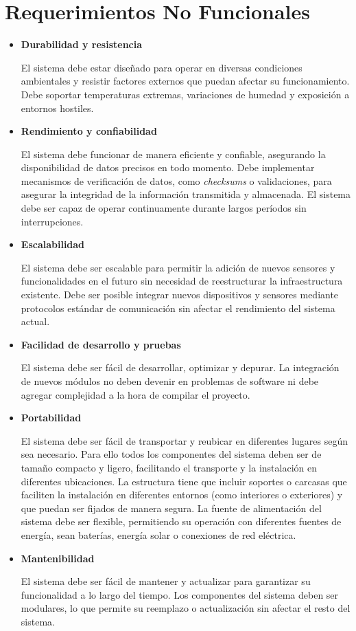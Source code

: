 \section{Requerimientos No Funcionales}
\begin{itemize}
    \item \textbf{Durabilidad y resistencia}
    
    El sistema debe estar diseñado para operar en diversas condiciones ambientales y resistir factores externos que puedan afectar su funcionamiento.
    Debe soportar temperaturas extremas, variaciones de humedad y exposición a entornos hostiles.

    \item \textbf{Rendimiento y confiabilidad}
    
    El sistema debe funcionar de manera eficiente y confiable, asegurando la disponibilidad de datos precisos en todo momento.
    Debe implementar mecanismos de verificación de datos, como \textit{checksums} o validaciones, para asegurar la integridad de la información transmitida y almacenada.
    El sistema debe ser capaz de operar continuamente durante largos períodos sin interrupciones.

    \item \textbf{Escalabilidad}
    
    El sistema debe ser escalable para permitir la adición de nuevos sensores y funcionalidades en el futuro sin necesidad de reestructurar la infraestructura existente.
    Debe ser posible integrar nuevos dispositivos y sensores mediante protocolos estándar de comunicación sin afectar el rendimiento del sistema actual.

    \item \textbf{Facilidad de desarrollo y pruebas}

    El sistema debe ser fácil de desarrollar, optimizar y depurar. La integración de nuevos módulos no deben devenir en problemas de software ni debe agregar complejidad a la hora de compilar el proyecto. 

    \item \textbf{Portabilidad}
    
    El sistema debe ser fácil de transportar y reubicar en diferentes lugares según sea necesario. Para ello todos los componentes del sistema deben ser de tamaño compacto y ligero, facilitando el transporte y la instalación en diferentes ubicaciones.
    La estructura tiene que incluir soportes o carcasas que faciliten la instalación en diferentes entornos (como interiores o exteriores) y que puedan ser fijados de manera segura.
    La fuente de alimentación del sistema debe ser flexible, permitiendo su operación con diferentes fuentes de energía, sean baterías, energía solar o conexiones de red eléctrica.

    \item \textbf{Mantenibilidad}
    
    El sistema debe ser fácil de mantener y actualizar para garantizar su funcionalidad a lo largo del tiempo.
    Los componentes del sistema deben ser modulares, lo que permite su reemplazo o actualización sin afectar el resto del sistema.


\end{itemize}

